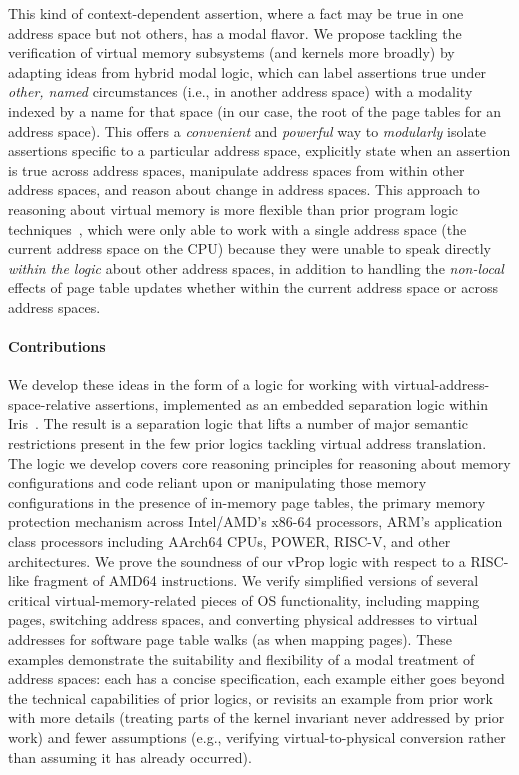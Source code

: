 This kind of context-dependent assertion, where a fact may be true in one address space but not others, has a modal flavor. 
We propose tackling the verification of virtual memory subsystems (and kernels more broadly) by adapting ideas from hybrid
modal logic, which can label assertions true under \emph{other, named} circumstances (i.e., in another address space) with a 
modality indexed by a name for that space (in our case, the root of the page tables for an address space). This offers a 
\textit{convenient} and \textit{powerful} way to \emph{modularly}
isolate assertions specific to a particular address space,
explicitly state when an assertion is true across address spaces,
manipulate address spaces from within other address spaces, and
reason about change in address spaces.
This approach to reasoning about virtual memory is more flexible than prior program logic techniques~\cite{kolanski08vstte,kolanski09tphols}, 
which were only able to work with a single address space (the current address space on the CPU) because they were unable
to speak directly \emph{within the logic} about other address spaces, in addition to handling
the \emph{non-local} effects of page table updates whether within the current address space or across address spaces.

\paragraph{Contributions}
We develop these ideas in the form of a logic for working with virtual-address-space-relative assertions,
implemented as an embedded separation logic within Iris~\cite{jung2018iris}.
The result is a separation logic that lifts a number of major semantic restrictions present in the few
prior logics tackling virtual address translation.
The logic we develop covers core reasoning principles for reasoning about memory configurations and code
reliant upon or manipulating those memory configurations in the presence of in-memory page tables, the primary
memory protection mechanism across Intel/AMD's x86-64 processors, ARM's application class processors including
AArch64 CPUs, POWER, RISC-V, and other architectures.
We prove the soundness of our \textsf{vProp} logic with respect to a RISC-like fragment of \textsf{AMD64} instructions.
We verify simplified versions of several critical virtual-memory-related pieces of OS functionality, 
including mapping  pages, switching address spaces, and converting physical addresses to virtual addresses for
software page table walks (as when mapping pages). These examples demonstrate the suitability and flexibility of
a modal treatment of address spaces: each has a concise specification, each example either goes beyond the technical
capabilities of prior logics, or revisits an example from prior work with more details (treating parts of the kernel
invariant never addressed by prior work) and fewer assumptions (e.g., verifying virtual-to-physical conversion rather
than assuming it has already occurred).

